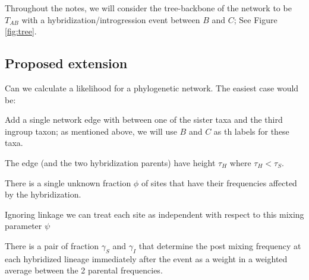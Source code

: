 \documentclass{article}
\begin{document}
Throughout the notes, we will consider the tree-backbone of the network to be $T_{AB}$ with a hybridization/introgression event between $B$ and $C$; See Figure \ref{fig:tree}.

\subsection{Proposed extension}
Can we calculate a likelihood for a phylogenetic network. 
The easiest case would be:
\begin{compactitem}
    \item Add a single network edge with between one of the sister taxa and the third ingroup taxon; as mentioned above, we will use $B$ and $C$ as th labels for these taxa.
    \item The edge (and the two hybridization parents) have height $\tau_H$ where $\tau_H < \tau_S$.
    \item There is a single unknown fraction $\phi$ of sites that have their frequencies affected by the hybridization.
    \item Ignoring linkage we can treat each site as independent with respect to this mixing parameter $\psi$
    \item There is a pair of fraction $\gamma_S$ and $\gamma_I$ that determine the post mixing frequency at each hybridized lineage immediately after the event as a weight in a weighted average between the 2 parental frequencies.
\end{compactitem}
\end{document}
